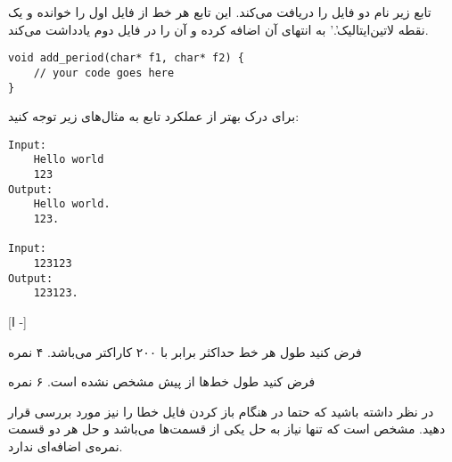 تابع زیر نام دو فایل را دریافت می‌کند.
این تابع هر خط از فایل اول را خوانده و یک نقطه
‌لاتین{‌ایتالیک{'.'}}
به انتهای آن اضافه کرده و آن را در فایل دوم یادداشت می‌کند.

\begin{latin}
\begin{verbatim}
void add_period(char* f1, char* f2) {
    // your code goes here
}
\end{verbatim}
\end{latin}

برای درک بهتر از عملکرد تابع به مثال‌های زیر توجه کنید:

\begin{latin}
\begin{verbatim}
Input:
    Hello world
    123
Output:
    Hello world.
    123.

Input:
    123123
Output:
    123123.
\end{verbatim}
\end{latin}

[ا -]

 فرض کنید طول هر خط حداکثر برابر با ۲۰۰ کاراکتر می‌باشد. ۴ نمره

 فرض کنید طول خط‌ها از پیش مشخص نشده است. ۶ نمره


در نظر داشته باشید که حتما در هنگام باز کردن فایل خطا را نیز مورد بررسی قرار دهید.
مشخص است که تنها نیاز به حل یکی از قسمت‌ها می‌باشد و حل هر دو قسمت نمره‌ی اضافه‌ای ندارد.
